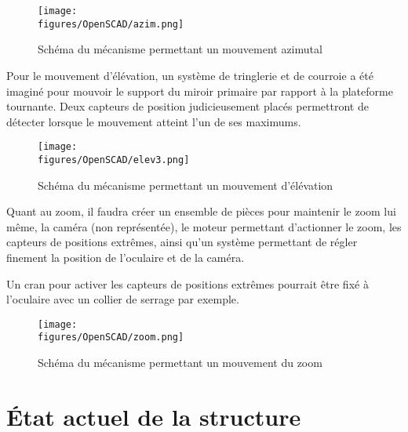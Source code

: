 \begin{figure}[H]
    \centering
    \texttt{[image: \\figures/OpenSCAD/azim.png]}
    \decoRule
    \caption[
    Schéma du mécanisme permettant un mouvement azimutal]{
    Schéma du mécanisme permettant un mouvement azimutal}
    \label{fig:Schéma du mécanisme permettant un mouvement azimutal}
    \end{figure}

\vspace{1cm}

Pour le mouvement d'élévation, un système de tringlerie et de courroie a été imaginé pour mouvoir le support du miroir primaire par rapport à la plateforme tournante. Deux capteurs de position judicieusement placés permettront de détecter lorsque le mouvement atteint l'un de ses maximums.

\begin{figure}[H]
    \centering
    \texttt{[image: \\figures/OpenSCAD/elev3.png]}
    \decoRule
    \caption[
    Schéma du mécanisme permettant un mouvement d'élévation]{
    Schéma du mécanisme permettant un mouvement d'élévation}
    \label{fig:Schéma du mécanisme permettant un mouvement d'élévation}
    \end{figure}

\vspace{1cm}

Quant au zoom, il faudra créer un ensemble de pièces pour maintenir le zoom lui même, la caméra (non représentée), le moteur permettant d'actionner le zoom, les capteurs de positions extrêmes, ainsi qu'un système permettant de régler finement la position de l'oculaire et de la caméra.

Un cran pour activer les capteurs de positions extrêmes pourrait être fixé à l'oculaire avec un collier de serrage par exemple.

\begin{figure}[H]
    \centering
    \texttt{[image: \\figures/OpenSCAD/zoom.png]}
    \decoRule
    \caption[
    Schéma du mécanisme permettant un mouvement du zoom]{
    Schéma du mécanisme permettant un mouvement du zoom}
    \label{fig:Schéma du mécanisme permettant un mouvement du zoom}
    \end{figure}

\section{État actuel de la structure}


